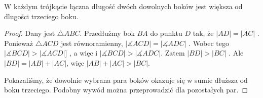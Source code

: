 \documentclass[12pt, a4paper]{scrartcl}
\begin{document}
\begin{theorem}
    W każdym trójkącie łączna długość dwóch dowolnych boków jest większa od
    dlugości trzeciego boku.

    \begin{figure}[!h]
        \begin{center}
        \end{center}
    \end{figure}

    \begin{proof}
        Dany jest \(\triangle ABC\). Przedłużmy bok \(BA\) do punktu \(D\)
         tak, że \(|AD| = |AC|\) . Ponieważ \(\triangle ACD\)
        jest równoramienny, \(|\measuredangle ACD| = |\measuredangle ADC|\)
        . Wobec tego \(|\measuredangle BCD| > |\measuredangle ACD|\)]
        , a więc i \(|\measuredangle BCD| > |\measuredangle ADC|\).
        Zatem \(|BD| > |BC|\) . Ale \(|BD| = |AB| + |AC|\), więc
        \(|AB| + |AC| > |BC|\).

        Pokazaliśmy, że dowolnie wybrana para boków okazuje się w sumie dłuższa
        od boku trzeciego. Podobny wywód można przeprowadzić dla pozostałych
        par.
    \end{proof}
\end{theorem}
\end{document}
